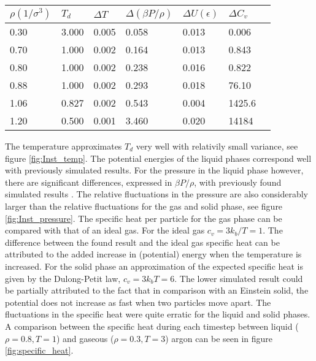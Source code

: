 \begin{center}
\centerfloat
{}
\begin{tabular}{lllllll}
\hline \hline
$\rho(1/\sigma^3)$ & $T_d$ & $\Delta T$ & $\Delta (\beta P/\rho)$ & $\Delta U(\epsilon)$ & $\Delta C_v$ \\
\hline
0.30 & 3.000 & 0.005 & 0.058 & 0.013 & 0.006\\
0.70 & 1.000 & 0.002 & 0.164 & 0.013 & 0.843\\
0.80 & 1.000 & 0.002 & 0.238 & 0.016 & 0.822\\
0.88& 1.000 & 0.002 & 0.293 & 0.018 & 76.10\\
1.06& 0.827& 0.002 & 0.543 & 0.004 & 1425.6\\
1.20 & 0.500 & 0.001 & 3.460 & 0.020 & 14184\\
\hline \hline
\end{tabular}
\vspace{-0.1cm}
\label{table:variance}
\end{center}
The temperature approximates $T_d$ very well with relativily small variance, see figure \ref{fig:Inst_temp}. The potential energies of the liquid phases correspond well with previously simulated results\cite{jos}. For the pressure in the liquid phase however, there are significant differences, expressed in $\beta P/\rho$, with previously found simulated results \cite{jos}. The relative fluctuations in the pressure are also considerably larger than the relative fluctuations for the gas and solid phase, see figure \ref{fig:Inst_pressure}. The specific heat per particle for the gas phase can be compared with that of an ideal gas.  For the ideal gas $c_v = 3k_b/T = 1$. The difference between the found result and the ideal gas specific heat can be attributed to the added increase in (potential) energy when the temperature is increased. For the solid phase an approximation of the expected specific heat is given by the Dulong-Petit law, $c_v = 3k_bT =  6$. The lower simulated result could be partially attributed to the fact that in comparison with an Einstein solid, the potential does not increase as fast when two particles move apart. The fluctuations in the specific heat were quite erratic for the liquid and solid phases. A comparison between the specific heat during each timestep between liquid ($\rho = 0.8, T = 1$) and gaseous ($\rho = 0.3, T = 3$) argon can be seen in figure \ref{fig:specific_heat}.


